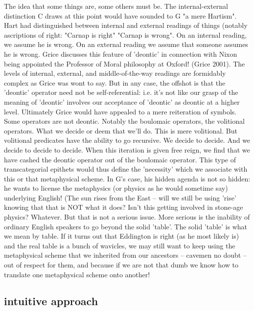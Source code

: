 \documentclass[10pt,titlepage]{book}
\begin{document}
{The idea that some things are, some others must be. The  internal-external 
distinction C draws at this point would have sounded to G "a  mere 
Hartism". Hart had distinguished between internal and external readings of  things 
(notably ascriptions of right: "Carnap is right" "Carnap is wrong". On an  
internal reading, we assume he is wrong. On an external reading we assume 
that  someone assumes he is wrong. Grice discusses this feature of 'deontic' 
in  connection with Nixon being appointed the Professor of Moral philosophy 
at  Oxford! (Grice 2001). The levels of internal, external, and 
middle-of-the-way  readings are formidably complex as Grice was wont to say. But in any 
case, the  offshot is that the 'deontic' operator need not be 
self-referential: i.e. it's  not like our grasp of the meaning of 'deontic' involves our 
acceptance of  'deontic' as deontic at a higher level. Ultimately Grice would 
have appealed to  a mere reiteration of symbols. Some operators are not 
deontic. Notably the  boulomaic operators, the volitional operators. What we 
decide or deem that  we'll do. This is mere volitional. But volitional 
predicates have the ability to  go recursive. We decide to decide. And we decide 
to decide to decide. When this  iteration is given free reign, we find that 
we have cashed the deontic operator  out of the boulomaic operator. This type 
of transcategorial epithets would  thus define the 'necessity' which we 
associate with this or that metaphysical  scheme. In G's case, his hidden 
agenda is not so hidden: he wants to license the  metaphysics (or physics as he 
would sometime say) underlying English! (The sun  rises from the East -- will 
we still be using 'rise' knowing that that is NOT  what it does? Isn't this 
getting involved in stone-age physics? Whatever. But  that is not a serious 
issue. More serious is the inability of ordinary English  speakers to go 
beyond the solid 'table'. The solid 'table' is what we mean by  table. If it 
turns out that Eddington is right (as he most likely is) and the  real table 
is a bunch of wavicles, we may still want to keep using the  metaphysical 
scheme that we inherited from our ancestors -- cavemen no doubt --  out of 
respect for them, and because if we are not that dumb we know how to  
translate one metaphysical scheme onto another!
 
\subsection{intuitive approach}

}
\end{document}
